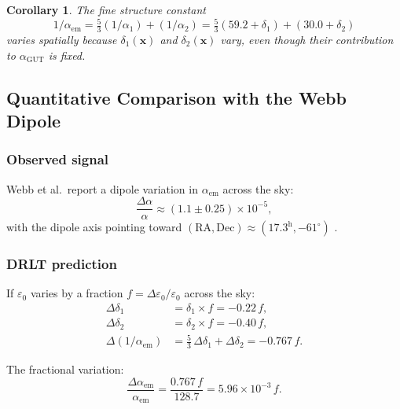 \documentclass[12pt]{article}
\newtheorem{corollary}[theorem]{Corollary}
\theoremstyle{remark}
\theoremstyle{definition}
\newcommand{\agut}{\alpha_{\mathrm{GUT}}}
\begin{document}
\begin{corollary}
The fine structure constant
\begin{equation}
1/\alpha_\text{em} = \tfrac{5}{3}(1/\alpha_1) + (1/\alpha_2) = \tfrac{5}{3}(59.2 + \delta_1) + (30.0 + \delta_2)
\end{equation}
varies spatially because $\delta_1(\mathbf{x})$ and $\delta_2(\mathbf{x})$ vary, even though their contribution to $\agut$ is fixed.
\end{corollary}

\subsection{Quantitative Comparison with the Webb Dipole}

\subsubsection{Observed signal}

Webb et al.\ report a dipole variation in $\alpha_\text{em}$ across the sky:
\begin{equation}
\frac{\Delta\alpha}{\alpha} \approx (1.1 \pm 0.25) \times 10^{-5},
\end{equation}
with the dipole axis pointing toward $(\text{RA}, \text{Dec}) \approx (17.3^\text{h}, -61^\circ)$ \cite{Webb}.

\subsubsection{DRLT prediction}

If $\varepsilon_0$ varies by a fraction $f = \Delta\varepsilon_0/\varepsilon_0$ across the sky:
\begin{align}
\Delta\delta_1 &= \delta_1 \times f = -0.22\,f, \\
\Delta\delta_2 &= \delta_2 \times f = -0.40\,f, \\
\Delta(1/\alpha_\text{em}) &= \tfrac{5}{3}\,\Delta\delta_1 + \Delta\delta_2 = -0.767\,f.
\end{align}

The fractional variation:
\begin{equation}
\frac{\Delta\alpha_\text{em}}{\alpha_\text{em}} = \frac{0.767\,f}{128.7} = 5.96 \times 10^{-3}\,f.
\end{equation}
\end{document}

